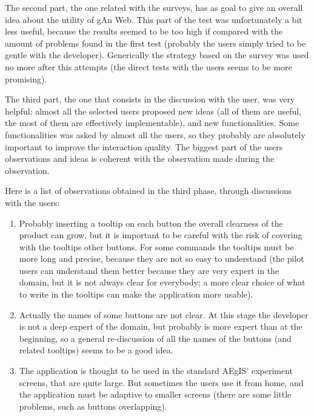 The second part, the one related with the surveys, has as goal to give an overall idea about the utility of gAn Web. This part of the test was unfortunately a bit less useful, because the results seemed to be too high if compared with the amount of problems found in the first test (probably the users simply tried to be gentle with the developer). Generically the strategy based on the survey was used no more after this attempts (the direct tests with the users seems to be more promising).

The third part, the one that consists in the discussion with the user, was very helpful: almost all the selected users proposed new ideas (all of them are useful, the most of them are effectively implementable), and new functionalities. Some functionalities was asked by almost all the users, so they probably are absolutely important to improve the interaction quality. 
The biggest part of the users observations and ideas is coherent with the observation made during the observation.

Here is a list of observations obtained in the third phase, through discussions with the users:

\begin{enumerate}

\item 
Probably inserting a tooltip on each button the overall clearness of the product can grow, but it is important to be careful with the risk of covering with the tooltips other buttons. For some commands the tooltips must be more long and precise, because they are not so easy to understand (the pilot users can understand them better because they are very expert in the domain, but it is not always clear for everybody; a more clear choice of what to write in the tooltips can make the application more usable).  

\item
Actually the names of some buttons are not clear. At this stage the developer is not a deep expert of the domain, but probably is more expert than at the beginning, so a general re-discussion of all the names of the buttons (and related tooltips) seems to be a good idea.

\item 
The application is thought to be used in the standard AEgIS' experiment screens, that are quite large. But sometimes the users use it from home, and the application must be adaptive to smaller screens (there are some little problems, such as buttons overlapping).

\end{enumerate}

